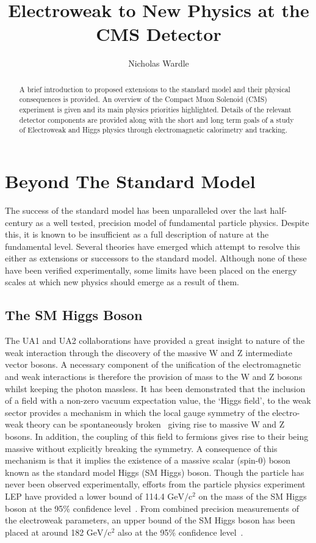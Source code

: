 \documentclass[a4paper,10pt]{article}
\title{Electroweak to New Physics at the CMS Detector}
\author{Nicholas Wardle}
\begin{document}
\maketitle

\begin{abstract}
A brief introduction to proposed extensions to the standard model and their physical consequences is provided.
An overview of the Compact Muon Solenoid (CMS) experiment is given and its main physics priorities highlighted. Details of the relevant detector components are provided along with the short and long term
goals of a study of Electroweak and Higgs physics through electromagnetic calorimetry and tracking.

\end{abstract}

\section{Beyond The Standard Model}

The success of the standard model has been unparalleled over the last half-century as a well tested, precision model of fundamental particle physics. Despite this, it is known to be insufficient 
as a full description of nature at the fundamental level.
Several theories have emerged which attempt to resolve this either as extensions or successors to the standard model. Although none of these have been verified experimentally, some limits have been placed
on the energy scales at which new physics should emerge as a result of them.

\subsection{The SM Higgs Boson}
The UA1 and UA2 collaborations have provided a great insight to nature of the weak interaction through the discovery of the massive W and Z intermediate vector bosons. 
A necessary component of the unification of the electromagnetic and weak interactions is therefore the provision of mass to the W and Z bosons whilst keeping the photon massless.
It has been demonstrated that the inclusion of a field with a non-zero vacuum expectation value, the `Higgs field', to the weak sector provides a mechanism in which the 
local gauge symmetry of the electro-weak theory can be spontaneously broken~\cite{higgs} giving rise to massive W and Z  bosons. 
In addition, the coupling of this field to fermions gives rise to their being massive without explicitly breaking the symmetry. 
A consequence of this mechanism is that it implies the existence of a massive scalar (spin-0) boson known as the standard model Higgs (SM Higgs) boson. 
Though the particle has never been observed experimentally, efforts from the particle physics experiment LEP have provided a lower bound of 114.4 $\mathrm{GeV/c^{2}}$ on the mass of the 
SM Higgs boson at the 95\% confidence level~\cite{smhiggs}. From combined precision measurements of the electroweak parameters, an upper bound of the SM Higgs boson has been placed at around 
182 $\mathrm{GeV/c^{2}}$ also at the 95\% confidence level~\cite{combsum}.
\end{document}
